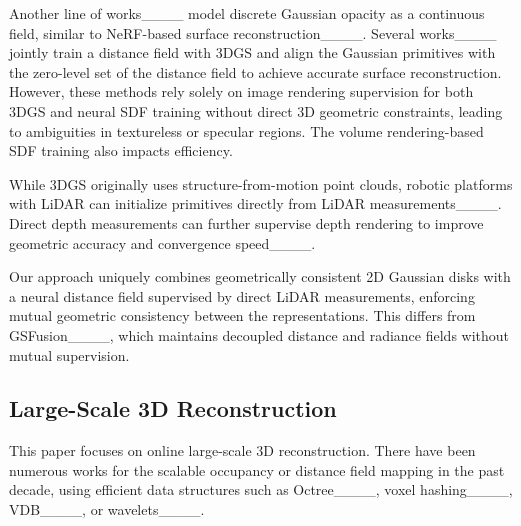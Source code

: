 Another line of works____ model discrete Gaussian opacity as a continuous field, similar to NeRF-based surface reconstruction____.
%
Several works____ jointly train a distance field with 3DGS and align the Gaussian primitives with the zero-level set of the distance field to achieve accurate surface reconstruction.
%
However, these methods rely solely on image rendering supervision for both 3DGS and neural SDF training without direct 3D geometric constraints, leading to ambiguities in textureless or specular regions.
%
The volume rendering-based SDF training also impacts efficiency.
%

While 3DGS originally uses structure-from-motion point clouds, robotic platforms with LiDAR can initialize primitives directly from LiDAR measurements____.
%
Direct depth measurements can further supervise depth rendering to improve geometric accuracy and convergence speed____.

%
%
%
Our approach uniquely combines geometrically consistent 2D Gaussian disks with a neural distance field supervised by direct LiDAR measurements, enforcing mutual geometric consistency between the representations.
%
This differs from GSFusion____, which maintains decoupled distance and radiance fields without mutual supervision.
%

\subsection{Large-Scale 3D Reconstruction}
\label{subsec:large_scale_3d_reconstruction}

This paper focuses on online large-scale 3D reconstruction.
%
There have been numerous works for the scalable occupancy or distance field mapping in the past decade, using efficient data structures such as Octree____, voxel hashing____,  VDB____, or wavelets____.
%

